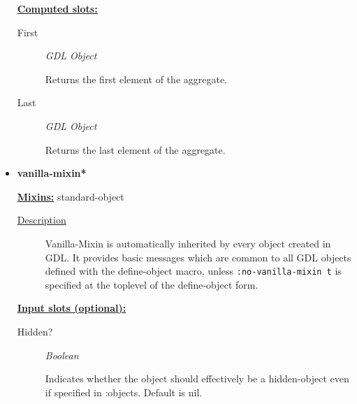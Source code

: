 \documentclass [11pt]{book}
\begin{document}
\begin{itemize}
\textbf{
\underline{Computed slots:}}

\begin{description}

\item [First]
\emph{GDL Object}

 Returns the first element of the aggregate.




\item [Last]
\emph{GDL Object}

 Returns the last element of the aggregate.




\end{description}







\item {}
\label{prim:vanilla-mixin*}
\textbf{vanilla-mixin*}


\textbf{
\underline{Mixins:}} standard-object





\begin{description}

\item [
\underline{Description}]


Vanilla-Mixin is automatically
inherited by every object created in GDL. It provides basic messages
which are common to all GDL objects defined with the define-object
macro, unless \texttt{:no-vanilla-mixin t} is specified at the
toplevel of the define-object form.



\end{description}








\textbf{
\underline{Input slots (optional):}}

\begin{description}

\item [Hidden?]
\emph{Boolean}

 Indicates whether the object should effectively be a hidden-object even if specified in :objects. Default is nil.





\end{description}
\end{itemize}
\end{document}
